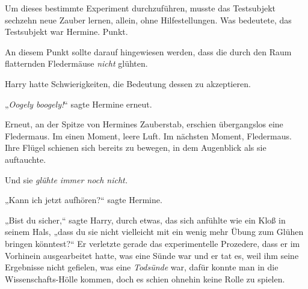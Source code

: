 Um dieses bestimmte Experiment durchzuführen, musste das Testsubjekt sechzehn neue Zauber lernen, allein, ohne Hilfestellungen. Was bedeutete, das Testsubjekt war Hermine. Punkt.

An diesem Punkt sollte darauf hingewiesen werden, dass die durch den Raum flatternden Fledermäuse \emph{nicht} glühten.

Harry hatte Schwierigkeiten, die Bedeutung dessen zu akzeptieren.

„\emph{Oogely boogely!}“ sagte Hermine erneut.

Erneut, an der Spitze von Hermines Zauberstab, erschien übergangslos eine Fledermaus. Im einen Moment, leere Luft. Im nächsten Moment, Fledermaus. Ihre Flügel schienen sich bereits zu bewegen, in dem Augenblick als sie auftauchte.

Und sie \emph{glühte immer noch nicht.}

„Kann ich jetzt aufhören?“ sagte Hermine.

„Bist du sicher,“ sagte Harry, durch etwas, das sich anfühlte wie ein Kloß in seinem Hals, „dass du sie nicht vielleicht mit ein wenig mehr Übung zum Glühen bringen könntest?“ Er verletzte gerade das experimentelle Prozedere, dass er im Vorhinein ausgearbeitet hatte, was eine Sünde war und er tat es, weil ihm seine Ergebnisse nicht gefielen, was eine \emph{Todsünde} war, dafür konnte man in die Wissenschafts-Hölle kommen, doch es schien ohnehin keine Rolle zu spielen.

